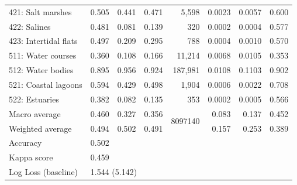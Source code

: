 \begin{table}[!hbt]
{\begin{tabular}{lrrrrrrr}
        421: Salt marshes                                       & 0.505         & 0.441     & 0.471    &   5,598        & 0.0023        & 0.0057        & 0.600 \\
        422: Salines                                            & 0.481         & 0.081     & 0.139    &     320        & 0.0002        & 0.0004        & 0.577 \\
        423: Intertidal flats                                   & 0.497         & 0.209     & 0.295    &     788        & 0.0004        & 0.0010        & 0.570 \\
        511: Water courses                                      & 0.360         & 0.108     & 0.166    &  11,214        & 0.0068        & 0.0105        & 0.353 \\
        512: Water bodies                                       & 0.895         & 0.956     & 0.924    & 187,981        & 0.0108        & 0.1103        & 0.902 \\
        521: Coastal lagoons                                    & 0.594         & 0.429     & 0.498    &   1,904        & 0.0006        & 0.0022        & 0.708 \\
        522: Estuaries                                          & 0.382         & 0.082     & 0.135    &     353        & 0.0002        & 0.0005        & 0.566 \\
        \midrule
        Macro average    & 0.460         & 0.327     & 0.356    & \multicolumn{1}{c}{\multirow{2}{*}{8097140}} & 0.083 & 0.137 & 0.452 \\
        Weighted average & 0.494         & 0.502     & 0.491    & \multicolumn{1}{c}{} & 0.157 & 0.253 & 0.389 \\ 
        \midrule
        Accuracy         & \multicolumn{4}{l}{0.502}                      \\
        Kappa score      & \multicolumn{4}{l}{0.459}                      \\ 
        Log Loss (baseline) & \multicolumn{4}{l}{1.544 (5.142)}                      \\
        \bottomrule
        \end{tabular}%
        }
        \end{table}
        
